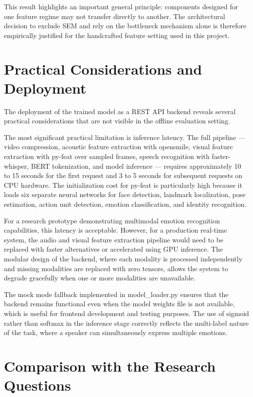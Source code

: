 This result highlights an important general principle: components designed for one feature regime may not transfer directly to another. The architectural decision to exclude SEM and rely on the bottleneck mechanism alone is therefore empirically justified for the handcrafted feature setting used in this project.

\section{Practical Considerations and Deployment}

The deployment of the trained model as a REST API backend reveals several practical considerations that are not visible in the offline evaluation setting.

The most significant practical limitation is inference latency. The full pipeline — video compression, acoustic feature extraction with opensmile, visual feature extraction with py-feat over sampled frames, speech recognition with faster-whisper, BERT tokenization, and model inference — requires approximately 10 to 15 seconds for the first request and 3 to 5 seconds for subsequent requests on CPU hardware. The initialization cost for py-feat is particularly high because it loads six separate neural networks for face detection, landmark localization, pose estimation, action unit detection, emotion classification, and identity recognition.

For a research prototype demonstrating multimodal emotion recognition capabilities, this latency is acceptable. However, for a production real-time system, the audio and visual feature extraction pipeline would need to be replaced with faster alternatives or accelerated using GPU inference. The modular design of the backend, where each modality is processed independently and missing modalities are replaced with zero tensors, allows the system to degrade gracefully when one or more modalities are unavailable.

The mock mode fallback implemented in model\_loader.py ensures that the backend remains functional even when the model weights file is not available, which is useful for frontend development and testing purposes. The use of sigmoid rather than softmax in the inference stage correctly reflects the multi-label nature of the task, where a speaker can simultaneously express multiple emotions.

\section{Comparison with the Research Questions}

